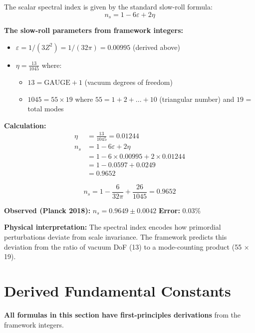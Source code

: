 \documentclass[12pt,a4paper]{article}
\newcommand{\Zsq}{Z^2}
\newcommand{\GAUGE}{\text{GAUGE}}
\begin{document}
The scalar spectral index is given by the standard slow-roll formula:
\begin{equation}
n_s = 1 - 6\varepsilon + 2\eta
\end{equation}

\textbf{The slow-roll parameters from framework integers:}

\begin{itemize}
    \item $\varepsilon = 1/(3\Zsq) = 1/(32\pi) = 0.00995$ (derived above)
    \item $\eta = \frac{13}{1045}$ where:
    \begin{itemize}
        \item $13 = \GAUGE + 1$ (vacuum degrees of freedom)
        \item $1045 = 55 \times 19$ where $55 = 1+2+...+10$ (triangular number) and $19$ = total modes
    \end{itemize}
\end{itemize}

\textbf{Calculation:}
\begin{align}
\eta &= \frac{13}{1045} = 0.01244 \\
n_s &= 1 - 6\varepsilon + 2\eta \\
&= 1 - 6 \times 0.00995 + 2 \times 0.01244 \\
&= 1 - 0.0597 + 0.0249 \\
&= 0.9652
\end{align}

\begin{equation}
\boxed{n_s = 1 - \frac{6}{32\pi} + \frac{26}{1045} = 0.9652}
\end{equation}

\textbf{Observed (Planck 2018):} $n_s = 0.9649 \pm 0.0042$ \quad \textbf{Error:} 0.03\%

\textbf{Physical interpretation:} The spectral index encodes how primordial perturbations deviate from scale invariance. The framework predicts this deviation from the ratio of vacuum DoF (13) to a mode-counting product (55 × 19).

\section{Derived Fundamental Constants}
\label{sec:constants}

\textbf{All formulas in this section have first-principles derivations} from the framework integers.
\end{document}
